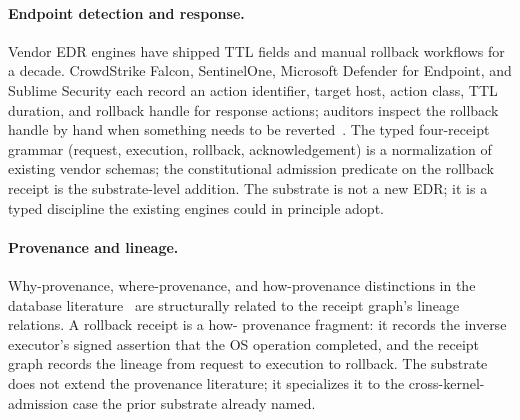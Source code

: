 \paragraph{Endpoint detection and response.}
Vendor EDR engines have shipped TTL fields and manual rollback
workflows for a decade. CrowdStrike Falcon, SentinelOne, Microsoft
Defender for Endpoint, and Sublime Security each record an action
identifier, target host, action class, TTL duration, and rollback
handle for response actions; auditors inspect the rollback handle by
hand when something needs to be reverted~\cite{edrVendorSchemasPlaceholder}. The
typed four-receipt grammar (request, execution, rollback,
acknowledgement) is a normalization of existing vendor schemas; the
constitutional admission predicate on the rollback receipt is the
substrate-level addition. The substrate is not a new EDR; it is a
typed discipline the existing engines could in principle adopt.

\paragraph{Provenance and lineage.}
Why-provenance, where-provenance, and how-provenance distinctions in
the database literature~\cite{cheney2009provenance} are structurally related to
the receipt graph's lineage relations. A rollback receipt is a how-
provenance fragment: it records the inverse executor's signed
assertion that the OS operation completed, and the receipt graph
records the lineage from request to execution to rollback. The
substrate does not extend the provenance literature; it specializes
it to the cross-kernel-admission case the prior substrate
\cite{programmableSovereigntyAnonymous} already named.

